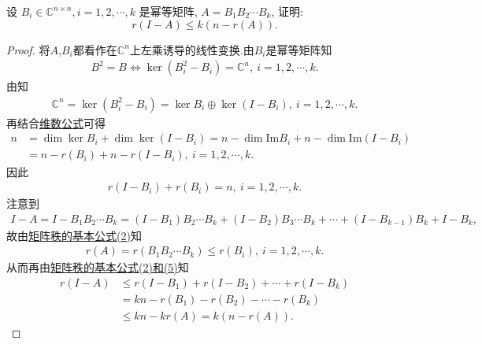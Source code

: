 \documentclass[../../main.tex]{subfiles}
\begin{document}
\begin{example}
设 $B_i \in \mathbb{C}^{n \times n}, i = 1, 2, \cdots, k$ 是幂等矩阵, $A = B_1 B_2 \cdots B_k$, 证明:
$$
r(I - A) \leqslant k(n - r(A)).
$$
\end{example}
\begin{proof}
将$A$,$B_i$都看作在$\mathbb{C}^n$上左乘诱导的线性变换.由$B_i$是幂等矩阵知
\begin{align*}
B^2 = B \Longleftrightarrow \ker (B_i^2 - B_i) = \mathbb{C}^n,\ i = 1,2,\cdots,k.
\end{align*}
由知
\begin{align*}
\mathbb{C}^n = \ker (B_i^2 - B_i) = \ker B_i \oplus \ker (I - B_i),\ i = 1,2,\cdots,k.
\end{align*}
再结合\hyperref[theorem:值域和核空间维数之和等于原像空间维数]{维数公式}可得
\begin{align*}
n &= \dim \ker B_i + \dim \ker (I - B_i) = n - \dim \mathrm{Im} B_i + n - \dim \mathrm{Im} (I - B_i) \\
&= n - r(B_i) + n - r(I - B_i),\ i = 1,2,\cdots,k.
\end{align*}
因此
\begin{align*}
r(I - B_i) + r(B_i) = n,\ i = 1,2,\cdots,k. 
\end{align*}
注意到
\begin{align*}
I - A = I - B_1B_2\cdots B_k = (I - B_1)B_2\cdots B_k + (I - B_2)B_3\cdots B_k + \cdots + (I - B_{k-1})B_k + I - B_k,
\end{align*}
故由\hyperref[proposition:矩阵秩的基本公式]{矩阵秩的基本公式(2)}知
\begin{align*}
r(A) = r(B_1B_2\cdots B_k) \leqslant r(B_i),\ i = 1,2,\cdots,k.
\end{align*}
从而再由\hyperref[proposition:矩阵秩的基本公式]{矩阵秩的基本公式(2)和(5)}知
\begin{align*}
r(I - A) &\leqslant r(I - B_1) + r(I - B_2) + \cdots + r(I - B_k) \\
&= kn - r(B_1) - r(B_2) - \cdots - r(B_k) \\
&\leqslant kn - kr(A) = k(n - r(A)).
\end{align*}
\end{proof}
\end{document}
